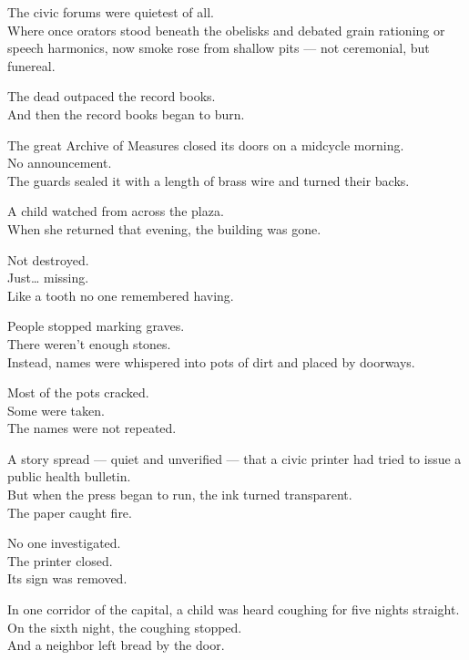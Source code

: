 \documentclass[9pt]{article}
\begin{document}
The civic forums were quietest of all.\\
Where once orators stood beneath the obelisks and debated grain rationing or speech harmonics, now smoke rose from shallow pits — not ceremonial, but funereal.

The dead outpaced the record books.\\
And then the record books began to burn.

\vspace{1em}

The great Archive of Measures closed its doors on a midcycle morning.\\
No announcement.\\
The guards sealed it with a length of brass wire and turned their backs.

A child watched from across the plaza.\\
When she returned that evening, the building was gone.

Not destroyed.\\
Just… missing.\\
Like a tooth no one remembered having.

\vspace{1em}

People stopped marking graves.\\
There weren’t enough stones.\\
Instead, names were whispered into pots of dirt and placed by doorways.

Most of the pots cracked.\\
Some were taken.\\
The names were not repeated.

\vspace{1em}

A story spread — quiet and unverified — that a civic printer had tried to issue a public health bulletin.\\
But when the press began to run, the ink turned transparent.\\
The paper caught fire.

No one investigated.\\
The printer closed.\\
Its sign was removed.

\vspace{1em}

In one corridor of the capital, a child was heard coughing for five nights straight.\\
On the sixth night, the coughing stopped.\\
And a neighbor left bread by the door.
\end{document}
